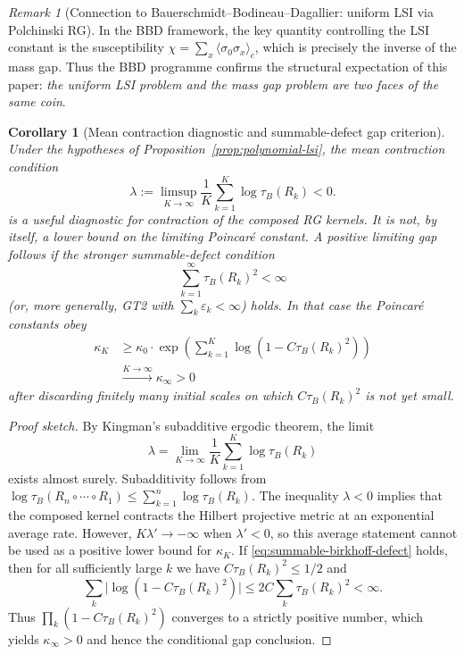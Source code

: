 \documentclass[12pt,a4paper]{article}
\theoremstyle{definition}
\theoremstyle{plain}
\newtheorem{corollary}[definition]{Corollary}
\theoremstyle{remark}
\newtheorem{remark}[definition]{Remark}
\begin{document}
\begin{remark}[Connection to Bauerschmidt--Bodineau--Dagallier: uniform LSI via Polchinski RG]
In the BBD framework, the key quantity controlling the LSI constant is the susceptibility $\chi = \sum_x \langle \sigma_0 \sigma_x \rangle_c$, which is precisely the inverse of the mass gap. Thus the BBD programme confirms the structural expectation of this paper: \emph{the uniform LSI problem and the mass gap problem are two faces of the same coin}.
\end{remark}

\begin{corollary}[Mean contraction diagnostic and summable-defect gap criterion]\label{cor:kingman-gap}
Under the hypotheses of Proposition~\ref{prop:polynomial-lsi}, the mean contraction condition
\begin{equation}\label{eq:mean-contraction}
  \lambda := \limsup_{K \to \infty} \frac{1}{K} \sum_{k=1}^{K} \log \tau_B(R_k) < 0.
\end{equation}
is a useful diagnostic for contraction of the composed RG kernels. It is not, by itself, a lower bound on the limiting Poincar\'e constant. A positive limiting gap follows if the stronger summable-defect condition
\begin{equation}\label{eq:summable-birkhoff-defect}
  \sum_{k=1}^{\infty} \tau_B(R_k)^2 < \infty
\end{equation}
(or, more generally, GT2 with $\sum_k \varepsilon_k < \infty$) holds. In that case the Poincar\'e constants obey
\begin{equation}
  \begin{aligned}
  \kappa_K
  &\geq \kappa_0 \cdot
  \exp\!\left(\sum_{k=1}^{K} \log(1 - C \tau_B(R_k)^2)\right)\\
  &\xrightarrow{K \to \infty} \kappa_\infty > 0
  \end{aligned}
\end{equation}
after discarding finitely many initial scales on which $C\tau_B(R_k)^2$ is not yet small.
\end{corollary}

\begin{proof}[Proof sketch]
By Kingman's subadditive ergodic theorem, the limit
\[
  \lambda =
  \lim_{K \to \infty} \frac{1}{K}
  \sum_{k=1}^{K} \log \tau_B(R_k)
\]
exists almost surely. Subadditivity follows from
$\log \tau_B(R_n \circ \cdots \circ R_1)
\leq \sum_{k=1}^n \log \tau_B(R_k)$.
The inequality $\lambda < 0$ implies that the composed kernel contracts the
Hilbert projective metric at an exponential average rate. However,
$K\lambda' \to -\infty$ when $\lambda' < 0$, so this average statement cannot
be used as a positive lower bound for $\kappa_K$. If
\eqref{eq:summable-birkhoff-defect} holds, then for all sufficiently large $k$
we have $C\tau_B(R_k)^2 \leq 1/2$ and
\[
  \sum_k \bigl|\log(1-C\tau_B(R_k)^2)\bigr|
  \leq 2C\sum_k \tau_B(R_k)^2 < \infty .
\]
Thus $\prod_k(1-C\tau_B(R_k)^2)$ converges to a strictly positive number,
which yields $\kappa_\infty>0$ and hence the conditional gap conclusion.
\end{proof}
\end{document}
